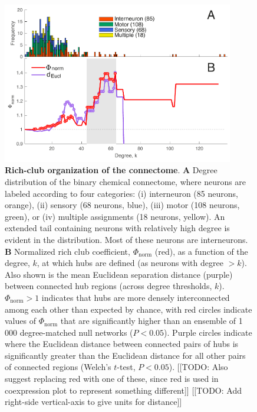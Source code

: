\documentclass[10pt,letterpaper]{article}
\begin{document}


\begin{figure}[h]
   \centering
    \includegraphics[width=0.9\textwidth]{topologicalRCall.pdf}
 \caption{\textbf{Rich-club organization of the connectome}.
\textbf{A} Degree distribution of the binary chemical connectome, where neurons are labeled according to four categories:
(i) interneuron (85 neurons, orange),
(ii) sensory (68 neurons, blue),
(iii) motor (108 neurons, green), or
(iv) multiple assignments (18 neurons, yellow).
An extended tail containing neurons with relatively high degree is evident in the distribution.
Most of these neurons are interneurons.
\textbf{B}
Normalized rich club coefficient, $\Phi_\mathrm{norm}$ (red), as a function of the degree, $k$, at which hubs are defined (as neurons with degree $>k$).
Also shown is the mean Euclidean separation distance (purple) between connected hub regions (across degree thresholds, $k$).
$\Phi_\mathrm{norm} > 1$ indicates that hubs are more densely interconnected among each other than expected by chance, with red circles indicate values of $\Phi_\mathrm{norm}$ that are significantly higher than an ensemble of 1\,000 degree-matched null networks ($P < 0.05$).
Purple circles indicate where the Euclidean distance between connected pairs of hubs is significantly greater than the Euclidean distance for all other pairs of connected regions (Welch's $t$-test, $P < 0.05$).
[[TODO: Also suggest replacing red with one of these, since red is used in coexpression plot to represent something different]]
[[TODO: Add right-side vertical-axis to give units for distance]]
}
 \label{fig:topology_rich}
 \end{figure}
\end{document}
